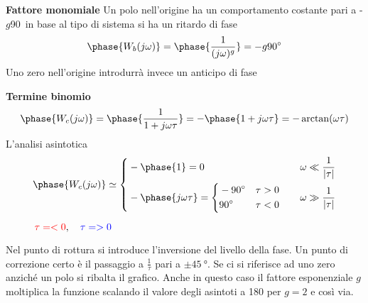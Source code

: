 \newpage
\textbf{Fattore monomiale} Un polo nell'origine ha un comportamento costante
pari a -$g$90\textdegree\ in base al tipo di sistema si ha un ritardo di fase
\begin{equation}
\phase{W_b(j\omega)} = \phase{\frac{1}{(j\omega)^g}} = -g\SI{90}{\degree}
\label{eq:fase_polo_origine}
\end{equation}
Uno zero nell'origine introdurrà invece un anticipo di fase

\textbf{Termine binomio}
$$
\phase{W_c(j\omega)} = \phase{\frac{1}{1+j\omega \tau}} =
-\phase{1+j\omega\tau} = -\arctan(\omega\tau)
$$
L'analisi asintotica
$$
\phase{W_c(j\omega)} \simeq \left\{
\begin{aligned}
&-\phase{1}= 0 & & & \omega \ll \frac{1}{|\tau|} \\
&-\phase{j\omega\tau} = \left\{
\begin{aligned}
&\SI{-90}{\degree} & &\tau> 0 \\
&\SI{90}{\degree} & & \tau<0
\end{aligned}\right. & & & \omega \gg \frac{1}{|\tau|}
\end{aligned}\right.
$$

\begin{figure}[h]
\centering
{}
\caption{$\textcolor{red}{\tau=<0},\quad
\textcolor{blue}{\tau=>0} $}
\label{fig.phase_monomio}
\end{figure}
Nel punto di rottura si introduce l'inversione del livello della fase.
Un punto di correzione certo è il passaggio a $\frac{1}{\tau}$ pari a $\pm
\SI{45}{\degree}$. Se ci si riferisce ad uno zero anziché un polo si ribalta il
grafico.
Anche in questo caso il fattore esponenziale $g$ moltiplica la funzione
scalando il valore degli asintoti a 180 per $g=2$ e così via.

